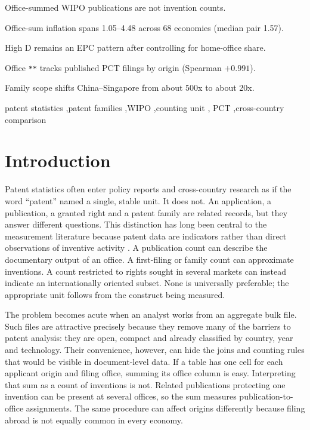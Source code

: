 \documentclass[a4paper,fleqn]{cas-dc}
\begin{document}
\begin{highlights}
\item Office-summed WIPO publications are not invention counts.
\item Office-sum inflation spans 1.05--4.48 across 68 economies (median pair 1.57).
\item High D remains an EPC pattern after controlling for home-office share.
\item Office \texttt{**} tracks published PCT filings by origin (Spearman $+0.991$).
\item Family scope shifts China--Singapore from about 500x to about 20x.
\end{highlights}

\begin{keywords}
patent statistics \sep patent families \sep WIPO \sep counting unit \sep
PCT \sep cross-country comparison
\end{keywords}

\maketitle

\section{Introduction}\label{sec:intro}

Patent statistics often enter policy reports and cross-country research as if
the word ``patent'' named a single, stable unit. It does not. An application, a
publication, a granted right and a patent family are related records, but they
answer different questions. This distinction has long been central to the
measurement literature because patent data are indicators rather than direct
observations of inventive activity \citep{griliches1990,oecd2009manual}. A
publication count can describe the documentary output of an office. A
first-filing or family count can approximate inventions. A count restricted to
rights sought in several markets can instead indicate an internationally
oriented subset. None is universally preferable; the appropriate unit follows
from the construct being measured.

The problem becomes acute when an analyst works from an aggregate bulk file.
Such files are attractive precisely because they remove many of the barriers
to patent analysis: they are open, compact and already classified by country,
year and technology. Their convenience, however, can hide the joins and
counting rules that would be visible in document-level data. If a table has one
cell for each applicant origin and filing office, summing its office column is
easy. Interpreting that sum as a count of inventions is not. Related
publications protecting one invention can be present at several offices, so
the sum measures publication-to-office assignments. The same procedure can
affect origins differently because filing abroad is not equally common in
every economy.
\end{document}
